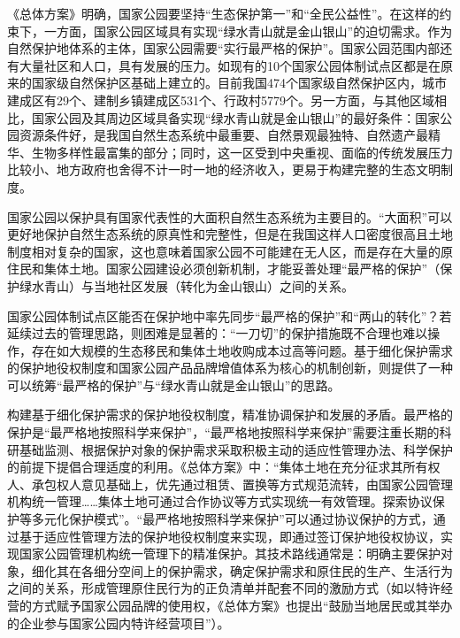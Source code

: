 \documentclass[
]{book}
\begin{document}
《总体方案》明确，国家公园要坚持``生态保护第一''和``全民公益性''。在这样的约束下，一方面，国家公园区域具有实现``绿水青山就是金山银山''的迫切需求。作为自然保护地体系的主体，国家公园需要``实行最严格的保护''。国家公园范围内部还有大量社区和人口，具有发展的压力。如现有的10个国家公园体制试点区都是在原来的国家级自然保护区基础上建立的。目前我国474个国家级自然保护区内，城市建成区有29个、建制乡镇建成区531个、行政村5779个。另一方面，与其他区域相比，国家公园及其周边区域具备实现``绿水青山就是金山银山''的最好条件：国家公园资源条件好，是我国自然生态系统中最重要、自然景观最独特、自然遗产最精华、生物多样性最富集的部分；同时，这一区受到中央重视、面临的传统发展压力比较小、地方政府也舍得不计一时一地的经济收入，更易于构建完整的生态文明制度。

国家公园以保护具有国家代表性的大面积自然生态系统为主要目的。``大面积''可以更好地保护自然生态系统的原真性和完整性，但是在我国这样人口密度很高且土地制度相对复杂的国家，这也意味着国家公园不可能建在无人区，而是存在大量的原住民和集体土地。国家公园建设必须创新机制，才能妥善处理``最严格的保护''（保护绿水青山）与当地社区发展（转化为金山银山）之间的关系。

国家公园体制试点区能否在保护地中率先同步``最严格的保护''和``两山的转化''？若延续过去的管理思路，则困难是显著的：``一刀切''的保护措施既不合理也难以操作，存在如大规模的生态移民和集体土地收购成本过高等问题。基于细化保护需求的保护地役权制度和国家公园产品品牌增值体系为核心的机制创新，则提供了一种可以统筹``最严格的保护''与``绿水青山就是金山银山''的思路。

构建基于细化保护需求的保护地役权制度，精准协调保护和发展的矛盾。最严格的保护是``最严格地按照科学来保护''，``最严格地按照科学来保护''需要注重长期的科研基础监测、根据保护对象的保护需求采取积极主动的适应性管理办法、科学保护的前提下提倡合理适度的利用。《总体方案》中：``集体土地在充分征求其所有权人、承包权人意见基础上，优先通过租赁、置换等方式规范流转，由国家公园管理机构统一管理\ldots\ldots 集体土地可通过合作协议等方式实现统一有效管理。探索协议保护等多元化保护模式''。``最严格地按照科学来保护''可以通过协议保护的方式，通过基于适应性管理方法的保护地役权制度来实现，即通过签订保护地役权协议，实现国家公园管理机构统一管理下的精准保护。其技术路线通常是：明确主要保护对象，细化其在各细分空间上的保护需求，确定保护需求和原住民的生产、生活行为之间的关系，形成管理原住民行为的正负清单并配套不同的激励方式（如以特许经营的方式赋予国家公园品牌的使用权，《总体方案》也提出``鼓励当地居民或其举办的企业参与国家公园内特许经营项目''）。
\end{document}
